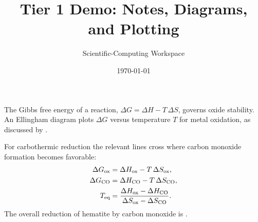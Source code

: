 \documentclass[11pt,a4paper]{article}
\title{Tier 1 Demo: Notes, Diagrams, and Plotting}
\author{Scientific-Computing Workspace}
\date{\today}
\begin{document}
\maketitle

\begin{theorybox}
The Gibbs free energy of a reaction, \(\Delta G = \Delta H - T\,\Delta S\),
governs oxide stability. An Ellingham diagram plots \(\Delta G\) versus
temperature \(T\) for metal oxidation, as discussed by \textcite{ellingham1944}.
\end{theorybox}

\begin{derivationbox}
For carbothermic reduction the relevant lines cross where carbon monoxide
formation becomes favorable:
\begin{align}
  \Delta G_{\text{ox}} &= \Delta H_{\text{ox}} - T\,\Delta S_{\text{ox}}, \\
  \Delta G_{\ce{CO}}   &= \Delta H_{\ce{CO}} - T\,\Delta S_{\ce{CO}}, \\
  T_{\text{eq}}        &= \frac{\Delta H_{\text{ox}} - \Delta H_{\ce{CO}}}
                              {\Delta S_{\text{ox}} - \Delta S_{\ce{CO}}} .
\end{align}
The overall reduction of hematite by carbon monoxide is
.
\end{derivationbox}
\end{document}
